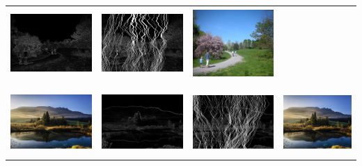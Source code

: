\documentclass[a4paper]{article}
\begin{document}
\begin{center}
\begin{tabular}{cccc}
  \includegraphics[height=2.7cm]{results_seamcarving/2/cost_init.png} &
  \includegraphics[height=2.7cm]{results_seamcarving/2/cost_remove.png} &
  \includegraphics[height=2.7cm]{results_seamcarving/2/image_output.png} \\\\
  \includegraphics[height=2.5cm]{results_seamcarving/3/image_input.png} &
  \includegraphics[height=2.5cm]{results_seamcarving/3/cost_init.png} &
  \includegraphics[height=2.5cm]{results_seamcarving/3/cost_remove.png} &
  \includegraphics[height=2.5cm]{results_seamcarving/3/image_output.png}
  \end{tabular}
  \end{center}
  
\end{document}
